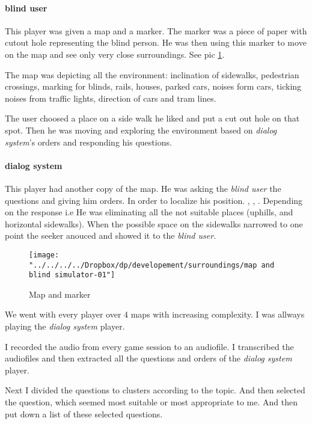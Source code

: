 				
				\paragraph{blind user}
					This player was given a map and a marker. The marker was a piece of paper with cutout hole representing the blind person. He was then using this  marker to move on the map and see only very close surroundings. See pic \ref{fig:map-and-blind-simulator}.
					
					The map was depicting all the environment: inclination of sidewalks, pedestrian crossings,
					marking for blinds, rails, houses, parked cars, noises form cars, ticking noises from traffic	lights, direction of cars and tram lines.
					
					The user choosed a place on a side walk he liked and put a cut out hole on that spot.
					Then he was moving and exploring the environment based
					on \emph{dialog system}'s orders and responding his questions.
				\paragraph{dialog system}
					This player had another copy of the map. He was asking the \emph{blind user} the questions and giving him orders. In order to localize his position. , , . Depending on the response i.e  He was
					eliminating all the not suitable places (uphills, and horizontal sidewalks). When the possible
					space on the sidewalks narrowed to one point the seeker anouced 
					and showed it to the \emph{blind user}.	
				
				\begin{figure}[th]
					\centering
					\texttt{[image: "../../../../Dropbox/dp/developement/surroundings/map and blind simulator-01"]}
					\caption{Map and marker}
					\label{fig:map-and-blind-simulator}
				\end{figure}
				
				We went with every player over 4 maps with increasing complexity. 
				I was allways playing the \emph{dialog system} player.
				
				I recorded the audio from every game session to an audiofile. I transcribed the audiofiles and then extracted all the questions and orders of the \emph{dialog system} player.
				
				Next I divided the questions to clusters according to the topic. And then selected the question, which seemed most suitable or most appropriate to me. And then put down a list of these selected questions.
			
